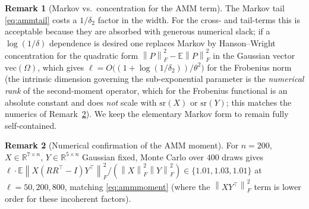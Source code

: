 \documentclass{amsart}
\theoremstyle{definition}
\newtheorem{remark}{Remark}
\newcommand{\R}{\mathbb{R}}
\newcommand{\Frob}[1]{\left\lVert #1\right\rVert_F}
\newcommand{\E}{\mathbb{E}}
\begin{document}
\begin{remark}[Markov vs.\ concentration for the AMM term]\label{rem:ammmarkov}
The Markov tail \eqref{eq:ammtail} costs a $1/\delta_2$ factor in the width. For
the cross- and tail-terms this is acceptable because they are absorbed with
generous numerical slack; if a $\log(1/\delta)$ dependence is desired one
replaces Markov by Hanson--Wright concentration for the quadratic form
$\Frob P^2-\E\Frob P^2$ in the Gaussian vector $\mathrm{vec}(\Omega)$, which
gives $\ell=O\big((1+\log(1/\delta_2))/\theta^2\big)$ for the Frobenius norm
(the intrinsic dimension governing the sub-exponential parameter is the
\emph{numerical rank} of the second-moment operator, which for the Frobenius
functional is an absolute constant and does \emph{not} scale with $\mathrm{sr}(X)$
or $\mathrm{sr}(Y)$; this matches the numerics of Remark~\ref{rem:ammnum}). We
keep the elementary Markov form to remain fully self-contained.
\end{remark}

\begin{remark}[Numerical confirmation of the AMM moment]\label{rem:ammnum}
For $n=200$, $X\in\R^{7\times n}$, $Y\in\R^{5\times n}$ Gaussian fixed, Monte
Carlo over $400$ draws gives
$\ell\cdot\E\Frob{X(RR^\top-I)Y^\top}^2/(\Frob X^2\Frob Y^2)\in\{1.01,1.03,1.01\}$
at $\ell=50,200,800$, matching \eqref{eq:ammmoment} (where the
$\Frob{XY^\top}^2$ term is lower order for these incoherent factors).
\end{remark}
\end{document}
